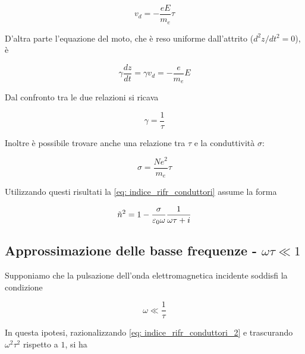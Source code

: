 \begin{equation}
    v_d = - \frac{e E}{m_e} \tau
\end{equation}

D'altra parte l'equazione del moto, che è reso uniforme dall'attrito ($d^2z/dt^2 = 0$), è 

\begin{equation}
    \gamma \frac{dz}{dt} = \gamma v_d = -\frac{e}{m_e} E
\end{equation}

Dal confronto tra le due relazioni si ricava 

\begin{equation}
    \gamma = \frac{1}{\tau}
\end{equation}

Inoltre è possibile trovare anche una relazione tra $\tau$ e la conduttività $\sigma$:

\begin{equation}
    \sigma = \frac{Ne^2}{m_e} \tau
\end{equation}

Utilizzando questi risultati la \eqref{eq: indice_rifr_conduttori} assume la forma 

\begin{tcolorbox}[colback=yellow!10!white, colframe=orange!70!black, boxrule=0.8pt]
\begin{equation} \label{eq: indice_rifr_conduttori_2}
    \tilde{n}^2 = 1 - \frac{\sigma}{\varepsilon_0 \omega} \frac{1}{\omega \tau + i}
\end{equation}
\end{tcolorbox}

\subsection{Approssimazione delle basse frequenze - $\omega \tau \ll 1$}

Supponiamo che la pulsazione dell'onda elettromagnetica incidente soddisfi la condizione 

\begin{tcolorbox}[colback=yellow!10!white, colframe=orange!70!black, boxrule=0.8pt]
\begin{equation}
    \omega \ll \frac{1}{\tau}
\end{equation}
\end{tcolorbox}

In questa ipotesi, razionalizzando \eqref{eq: indice_rifr_conduttori_2} e trascurando $\omega^2 \tau^2$ rispetto a $1$, si ha 

